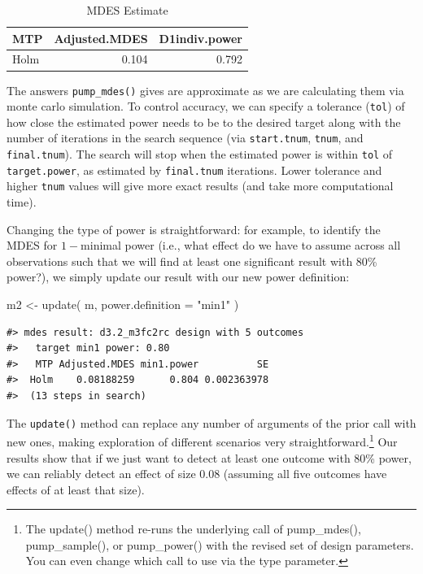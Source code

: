 \documentclass[
]{article}
\newenvironment{Shaded}{\begin{snugshade}}{\end{snugshade}}
\newcommand{\AttributeTok}[1]{\textcolor[rgb]{0.77,0.63,0.00}{#1}}
\newcommand{\FunctionTok}[1]{\textcolor[rgb]{0.00,0.00,0.00}{#1}}
\newcommand{\NormalTok}[1]{#1}
\newcommand{\OtherTok}[1]{\textcolor[rgb]{0.56,0.35,0.01}{#1}}
\newcommand{\StringTok}[1]{\textcolor[rgb]{0.31,0.60,0.02}{#1}}
\begin{document}
\begin{table}[h!]

\caption{\label{tab:unnamed-chunk-3}MDES Estimate}
\centering
\begin{tabular}[t]{lrr}
\toprule
MTP & Adjusted.MDES & D1indiv.power\\
\midrule
Holm & 0.104 & 0.792\\
\bottomrule
\end{tabular}
\end{table}

The answers \texttt{pump\_mdes()} gives are approximate as we are
calculating them via monte carlo simulation. To control accuracy, we can
specify a tolerance (\texttt{tol}) of how close the estimated power
needs to be to the desired target along with the number of iterations in
the search sequence (via \texttt{start.tnum}, \texttt{tnum}, and
\texttt{final.tnum}). The search will stop when the estimated power is
within \texttt{tol} of \texttt{target.power}, as estimated by
\texttt{final.tnum} iterations. Lower tolerance and higher \texttt{tnum}
values will give more exact results (and take more computational time).

Changing the type of power is straightforward: for example, to identify
the MDES for \(1-\)minimal power (i.e., what effect do we have to assume
across all observations such that we will find at least one significant
result with 80\% power?), we simply update our result with our new power
definition:

\begin{Shaded}
\begin{Highlighting}[]
\NormalTok{m2 }\OtherTok{\textless{}{-}} \FunctionTok{update}\NormalTok{( m, }\AttributeTok{power.definition =} \StringTok{"min1"}\NormalTok{ )}
\end{Highlighting}
\end{Shaded}

\begin{verbatim}
#> mdes result: d3.2_m3fc2rc design with 5 outcomes
#>   target min1 power: 0.80
#>   MTP Adjusted.MDES min1.power          SE
#>  Holm    0.08188259      0.804 0.002363978
#>  (13 steps in search)
\end{verbatim}

The \texttt{update()} method can replace any number of arguments of the
prior call with new ones, making exploration of different scenarios very
straightforward.\footnote{The update() method re-runs the underlying
  call of pump\_mdes(), pump\_sample(), or pump\_power() with the
  revised set of design parameters. You can even change which call to
  use via the type parameter.} Our results show that if we just want to
detect at least one outcome with 80\% power, we can reliably detect an
effect of size \(0.08\) (assuming all five outcomes have effects of at
least that size).
\end{document}
